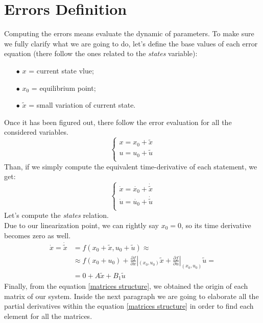 \documentclass[a4paper,12pt,titlepage]{report}
\begin{document}
\section{Errors Definition}
	Computing the errors means evaluate the dynamic of parameters. To make sure we fully clarify what we are going to do, let's define the base values of each error equation (there follow the ones related to the \textit{states} variable):
		\begin{itemize}
			\item[$\bullet$] $x$ = current state vlue;
			\item[$\bullet$] $x_{0}$ = equilibrium point;
			\item[$\bullet$] $\tilde{x}$ = small variation of current state.
		\end{itemize}
	Once it has been figured out, there follow the error evaluation for all the considered variables.
		\begin{equation*}
			\begin{cases}
				x = x_{0} + \tilde{x} \\
				u = u_{0} + \tilde{u} \\
			\end{cases}
		\end{equation*}
	Than, if we simply compute the equivalent time-derivative of each statement, we get:
		\begin{equation*}
			\begin{cases}
				\dot{x} = \dot{x_{0}} + \dot{\tilde{x}} \\
				\dot{u} = \dot{u_{0}} + \dot{\tilde{u}} \\
			\end{cases}
		\end{equation*}
	Let's compute the \textit{states} relation.\\
	Due to our linearization point, we can rightly say $x_{0} = 0 $, so its time derivative becomes zero as well.
		\begin{equation} \label{matrices structure}
			\begin{split}
				\dot{x}  = \dot{\tilde{x}} &= f(x_{0}+\tilde{x},u_{0}+\tilde{u})\approx \\
				&\approx f(x_{0}+u_{0}) + \frac{\partial f}{\partial x} |_{(x_{0},u_{0})} \tilde{x} + \frac{\partial f}{\partial u} |_{(x_{0},u_{0})} \tilde{u} = \\
				&= 0 + A \tilde{x} + B_{1} \tilde{u} 
			\end{split}
		\end{equation}
	Finally, from the equation \ref{matrices structure}, we obtained the origin of each matrix of our system. Inside the next paragraph we are going to elaborate all the partial derivatives within the equation \ref{matrices structure} in order to find each element for all the matrices.
\end{document}
